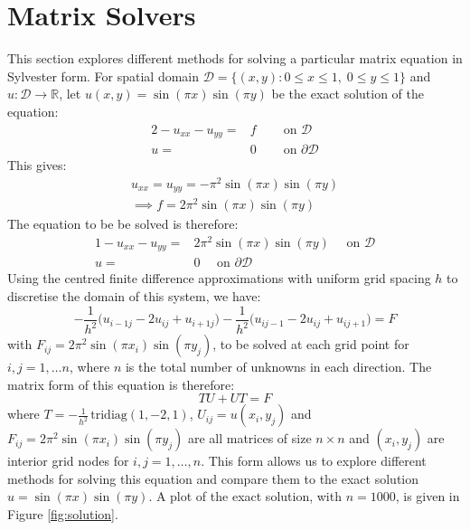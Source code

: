 \documentclass[11pt]{article}
\numberwithin{equation}{section}
\begin{document}
\newpage

\section{Matrix Solvers}
This section explores different methods for solving a particular matrix equation in Sylvester form. For spatial domain $\mathcal{D} = \{(x,y) : 0 \leq x \leq 1, \; 0 \leq y \leq 1 \}$ and $u: \mathcal{D} \rightarrow \mathbb{R}$, let $u(x,y) = \sin{(\pi x)} \sin{(\pi y)}$ be the exact solution of the equation:
\begin{alignat}{2}
-u_{xx} -u_{yy} = {} & f \quad & \text{ on } \mathcal{D} \nonumber \\
u = {} & 0 \quad & \text{ on } \partial \mathcal{D}
\end{alignat}
This gives:
\begin{equation}
\begin{split}
u_{xx} = u_{yy} = - \pi^2 \sin{(\pi x)} \sin{(\pi y)} \\
\implies f = 2 \pi^2 \sin{(\pi x)} \sin {(\pi y)}
\end{split}
\end{equation} 
The equation to be be solved is therefore:
\begin{alignat}{1}
-u_{xx} -u_{yy} = {} & 2 \pi^2 \sin{(\pi x)} \sin {(\pi y)} \quad \text{ on } \mathcal{D} \nonumber \\
u = {} & 0 \quad \text{ on } \partial \mathcal{D}
\end{alignat}
Using the centred finite difference approximations with uniform grid spacing $h$ to discretise the domain of this system, we have:
	\begin{equation}
	-\frac{1}{h^2} \big( u_{i-1j} - 2u_{ij} + u_{i+1j} \big) - \frac{1}{h^2} \big( u_{ij-1} - 2u_{ij} + u_{ij+1} \big) = F
	\end{equation}
with $F_{ij} = 2\pi^2 \sin(\pi x_i) \sin(\pi y_j)$, to be solved at each grid point for $i, j = 1, \dots n$, where $n$ is the total number of unknowns in each direction. The matrix form of this equation is therefore:
\begin{equation}
	TU + UT = F
\end{equation}
where $T=-\frac{1}{h^2} \, \text{tridiag}(1,-2,1)$, $U_{ij} = u(x_i, y_j)$ and $F_{ij} = 2 \pi^2 \sin(\pi x_i) \sin(\pi y_j)$ are all matrices of size $n \times n$ and $(x_i, y_j)$ are interior grid nodes for $i,j=1,\dots,n$. This form allows us to explore different methods for solving this equation and compare them to the exact solution $u = \sin(\pi x) \sin(\pi y)$. A plot of the exact solution, with $n=1000$, is given in Figure \ref{fig:solution}. 
\end{document}
